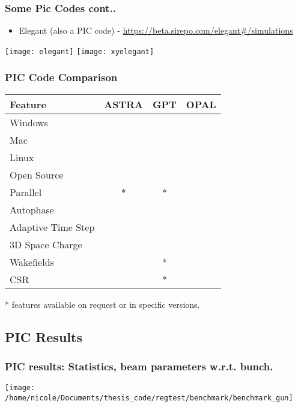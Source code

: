 \documentclass[professionalfonts,t]{beamer}
\newcommand{\cmark}{\ding{51}}%
\newcommand{\xmark}{\ding{55}}%
\begin{document}
\begin{frame}
\frametitle{Some Pic Codes cont..}
\begin{itemize}
	\item Elegant (also a PIC code) - \url{https://beta.sirepo.com/elegant\#/simulations}
\end{itemize}

\centering
\texttt{[image: elegant]}%
\texttt{[image: xyelegant]}
\end{frame}


\begin{frame}
\frametitle{PIC Code Comparison}
\centering
\vspace{-0.2cm}
\begin{table}
	\begin{minipage}{0.8\textwidth}
		\begin{center}	
			\begin{tabular}{l c c c}
				\toprule
				\textbf{Feature} & \textbf{ASTRA} & \textbf{GPT} & \textbf{OPAL}\\
				\midrule
				Windows     		& \cmark & \cmark & \alert \xmark \\ 
				Mac         		& \cmark & \cmark & \cmark \\
				Linux       		& \cmark & \cmark & \cmark \\
				Open Source 		& \alert \xmark & \alert \xmark & \color{black!30!green}\cmark \\
				Parallel    		& \alert \xmark * & \alert \xmark * & \color{black!30!green}\cmark \\
				Autophase   		& \cmark & \xmark & \cmark \\
				Adaptive Time Step 	& \xmark & \cmark & \xmark \\
				3D Space Charge 	& \cmark & \cmark & \cmark \\
				Wakefields  		& \cmark & \xmark * & \color{black!30!green}\cmark \\
				CSR         		& \alert \xmark & \xmark * & \color{black!30!green}\cmark \\
				\bottomrule
			\end{tabular}
		\end{center}
	\end{minipage}
\end{table}
* features available on request or in specific versions.
\end{frame}




\subsection{PIC Results}
\begin{frame}
\frametitle{PIC results: Statistics, beam parameters w.r.t. bunch.}
\vspace{-0.5em}
\centering

	\texttt{[image: /home/nicole/Documents/thesis\_code/regtest/benchmark/benchmark\_gun]}
\end{frame}
\end{document}
